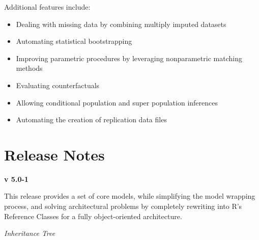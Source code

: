 \documentclass[letterpaper,10pt,english]{sphinxmanual}
\begin{document}
Additional features include:
\begin{itemize}
\item {} 
Dealing with missing data by combining multiply imputed datasets

\item {} 
Automating statistical bootstrapping

\item {} 
Improving parametric procedures by leveraging nonparametric matching methods

\item {} 
Evaluating counterfactuals

\item {} 
Allowing conditional population and super population inferences

\item {} 
Automating the creation of replication data files

\end{itemize}


\section{Release Notes}
\label{about:release-notes}
\textbf{v 5.0-1}

This release provides a set of core models, while simplifying the model wrapping process, and solving architectural problems by completely rewriting into R’s Reference Classes for a fully object-oriented architecture.

\emph{Inheritance Tree}



\renewcommand{\indexname}{Index}
\printindex
\end{document}
